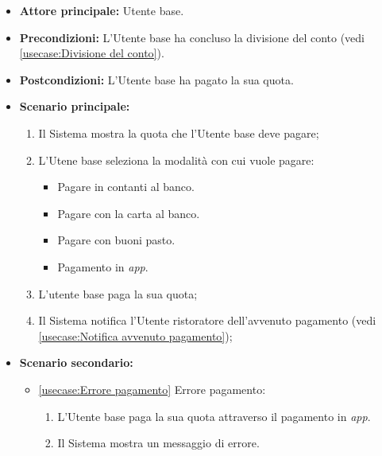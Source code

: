 \label{usecase:Pagamento del conto}
\begin{itemize}
	\item \textbf{Attore principale:} Utente base.

	\item \textbf{Precondizioni:} L'Utente base ha concluso la divisione del conto (vedi \autoref{usecase:Divisione del conto}).

	\item \textbf{Postcondizioni:} L'Utente base ha pagato la sua quota.

	\item \textbf{Scenario principale:}
            \begin{enumerate}
                \item Il Sistema mostra la quota che l'Utente base deve pagare;
                \item L'Utene base seleziona la modalità con cui vuole pagare:
                \begin{itemize}
                    \item Pagare in contanti al banco.
                    \item Pagare con la carta al banco.
                    \item Pagare con buoni pasto.
                    \item Pagamento in \textit{app}.
                \end{itemize}
				\item L'utente base paga la sua quota;
				\item Il Sistema notifica l'Utente ristoratore dell'avvenuto pagamento (vedi \autoref{usecase:Notifica avvenuto pagamento});
	      \end{enumerate}

    \item \textbf{Scenario secondario:}
		  \begin{itemize}
			  \item \autoref{usecase:Errore pagamento} Errore pagamento:
				\begin{enumerate}
					\item L'Utente base paga la sua quota attraverso il pagamento in \textit{app}.
	
					\item  Il Sistema mostra un messaggio di errore.
				\end{enumerate}
		  \end{itemize}
\end{itemize}